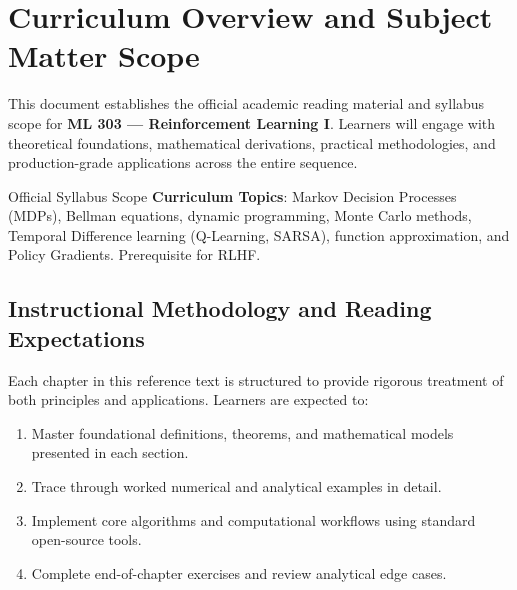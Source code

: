 \section{Curriculum Overview and Subject Matter Scope}

This document establishes the official academic reading material and syllabus scope for \textbf{ML 303 --- Reinforcement Learning I}. Learners will engage with theoretical foundations, mathematical derivations, practical methodologies, and production-grade applications across the entire sequence.

\begin{InsightBox}{Official Syllabus Scope}
  \textbf{Curriculum Topics}: Markov Decision Processes (MDPs), Bellman equations, dynamic programming, Monte Carlo methods, Temporal Difference learning (Q-Learning, SARSA), function approximation, and Policy Gradients. Prerequisite for RLHF.
\end{InsightBox}

\subsection{Instructional Methodology and Reading Expectations}

Each chapter in this reference text is structured to provide rigorous treatment of both principles and applications. Learners are expected to:
\begin{enumerate}
  \item Master foundational definitions, theorems, and mathematical models presented in each section.
  \item Trace through worked numerical and analytical examples in detail.
  \item Implement core algorithms and computational workflows using standard open-source tools.
  \item Complete end-of-chapter exercises and review analytical edge cases.
\end{enumerate}

